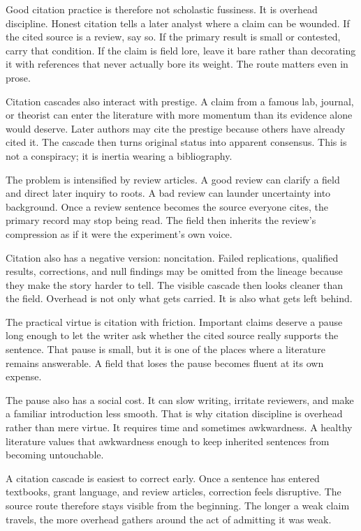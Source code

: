Good citation practice is therefore not scholastic fussiness. It is overhead
discipline. Honest citation tells a later analyst where a claim can be
wounded. If the cited source is a review, say so. If the primary result is
small or contested, carry that condition. If the claim is field lore, leave
it bare rather than decorating it with references that never actually bore
its weight. The route matters even in prose.

Citation cascades also interact with prestige. A claim from a famous lab,
journal, or theorist can enter the literature with more momentum than its
evidence alone would deserve. Later authors may cite the prestige because
others have already cited it. The cascade then turns original status into
apparent consensus. This is not a conspiracy; it is inertia wearing a
bibliography.

The problem is intensified by review articles. A good review can clarify a
field and direct later inquiry to roots. A bad review can launder
uncertainty into background. Once a review sentence becomes the source everyone cites, the
primary record may stop being read. The field then inherits the review's
compression as if it were the experiment's own voice.

Citation also has a negative version: noncitation. Failed replications,
qualified results, corrections, and null findings may be omitted from the
lineage because they make the story harder to tell. The visible cascade then
looks cleaner than the field. Overhead is not only what gets carried. It is
also what gets left behind.

The practical virtue is citation with friction. Important claims deserve a
pause long enough to let the writer ask whether the cited source really
supports the sentence. That pause is small, but it is one of the places where a
literature remains answerable. A field that loses the pause becomes fluent at
its own expense.

The pause also has a social cost. It can slow writing, irritate reviewers, and
make a familiar introduction less smooth. That is why citation discipline is
overhead rather than mere virtue. It requires time and sometimes awkwardness.
A healthy literature values that awkwardness enough to keep inherited
sentences from becoming untouchable.

A citation cascade is easiest to correct early. Once a sentence has entered
textbooks, grant language, and review articles, correction feels disruptive.
The source route therefore stays visible from the beginning. The
longer a weak claim travels, the more overhead gathers around the act of
admitting it was weak.

